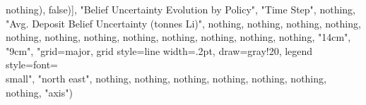\documentclass[tikz]{standalone}
\begin{document}
nothing), false)], "Belief Uncertainty Evolution by Policy", "Time Step", nothing, "Avg. Deposit Belief Uncertainty (tonnes Li)", nothing, nothing, nothing, nothing, nothing, nothing, nothing, nothing, nothing, nothing, nothing, nothing, "14cm", "9cm", "grid=major, grid style={line width=.2pt, draw=gray!20}, legend style={font=\\small}", "north east", nothing, nothing, nothing, nothing, nothing, nothing, nothing, "axis")
\end{document}
